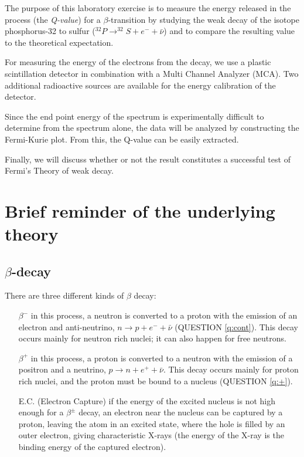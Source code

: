 \documentclass[a4,11pt, notitlepage]{article}
\begin{document}
The purpose of this laboratory exercise is to measure the energy
released in the process (the \textit{Q-value}) for a
$\beta$-transition by studying the weak decay of the isotope
phosphorus-32 to sulfur ($^{32}P\rightarrow ^{32}S + e^- + \bar{\nu}$) and to compare the
resulting value to the theoretical expectation. 

For measuring the energy of the electrons from the decay, we use a
plastic scintillation detector in combination with a Multi Channel
Analyzer (MCA). Two additional radioactive sources are available for
the energy calibration of the detector.

Since the end point energy of the spectrum is experimentally difficult
to determine from the spectrum alone, the data will be analyzed by
constructing the Fermi-Kurie plot. From this, the Q-value can be
easily extracted.

Finally, we will discuss whether or not the result constitutes a
successful test of Fermi's Theory of weak decay.

\section{Brief reminder of the underlying theory}
\subsection{$\beta$-decay}

There are three different kinds of $\beta$ decay:
\begin{itemize}
\item[$\beta^-$] in this process, a neutron is converted to a proton with the emission of an electron and anti-neutrino, $n\rightarrow p + e^- + \bar \nu$ (QUESTION \ref{q:cont}). This decay occurs mainly for neutron rich nuclei; it can also happen for free neutrons.
\item[$\beta^+$] in this process, a proton is converted to a neutron with the emission of a positron and a neutrino, $p\rightarrow n + e^+ + \bar \nu$. This decay occurs mainly for proton rich nuclei, and the proton must be bound to a nucleus (QUESTION \ref{q:+}).
\item[E.C.] (Electron Capture) if the energy of the excited nucleus is not high enough for a $\beta^{\pm}$ decay, an electron near the nucleus can be captured by a proton, leaving the atom in an excited state, where the hole is filled by an outer electron, giving characteristic X-rays (the energy of the X-ray is the binding energy of the captured electron).
\end{itemize}
\end{document}
